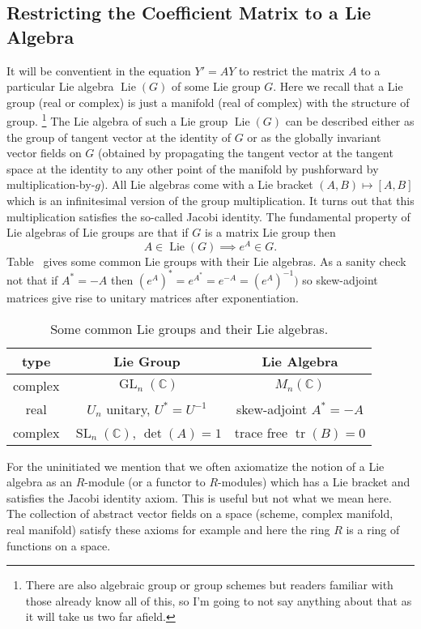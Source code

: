 \documentclass[12pt]{book}
\numberwithin{equation}{section}
\theoremstyle{definition}
\theoremstyle{remark}
\newcommand{\CC}{\mathbb{C}}
\newcommand{\GL}{\operatorname{GL}}
\newcommand{\tr}{\operatorname{tr}}
\newcommand{\SL}{\operatorname{SL}}
\newcommand{\Lie}{\operatorname{Lie}}
\begin{document}
\subsection{Restricting the Coefficient Matrix to a Lie Algebra}
It will be conventient in the equation $ Y' = A Y $ to restrict the matrix $A$ to a particular Lie algebra $\Lie(G)$ of some Lie group $G$. 
Here we recall that a Lie group (real or complex) is just a manifold (real of complex) with the structure of group. 
\footnote{There are also algebraic group or group schemes but readers familiar with those already know all of this, so I'm going to not say anything about that as it will take us two far afield.}
The Lie algebra of such a Lie group $\Lie(G)$ can be described either as the group of tangent vector at the identity of $G$ or as the globally invariant vector fields on $G$ (obtained by propagating the tangent vector at the tangent space at the identity to any other point of the manifold by pushforward by multiplication-by-$g$). 
All Lie algebras come with a Lie bracket $(A,B) \mapsto [A,B]$ which is an infinitesimal version of the group multiplication. 
It turns out that this multiplication satisfies the so-called Jacobi identity.
The fundamental property of Lie algebras of Lie groups are that if $G$ is a matrix Lie group then
 $$A\in \Lie(G) \implies e^A \in G.$$
Table~\label{T:lie} gives some common Lie groups with their Lie algebras.
As a sanity check not that if $A^*=-A$ then $(e^A)^* = e^{A^*}=e^{-A} = (e^{A})^{-1})$ so skew-adjoint matrices give rise to unitary matrices after exponentiation.
\begin{table}\label{T:lie}
	\begin{center}
		\begin{tabular}{ccc}
			type & Lie Group & Lie Algebra\\
			\hline complex & $\GL_n(\CC)$ & $M_n(\CC)$ \\
			real & $U_n$ unitary, $U^*=U^{-1}$ & skew-adjoint $A^*=-A$ \\
			complex & $\SL_n(\CC)$, $\det(A)=1$ & trace free $\tr(B)=0$ 
		\end{tabular}
	\end{center}
	\caption{Some common Lie groups and their Lie algebras.}
\end{table}

For the uninitiated we mention that we often axiomatize the notion of a Lie algebra as an $R$-module (or a functor to $R$-modules) which has a Lie bracket and satisfies the Jacobi identity axiom. 
This is useful but not what we mean here. 
The collection of abstract vector fields on a space (scheme, complex manifold, real manifold) satisfy these axioms for example and here the ring $R$ is a ring of functions on a space. 
\end{document}
